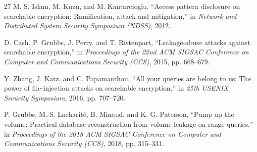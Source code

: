 \begin{thebibliography}{27}
 M. S. Islam, M. Kuzu, and M. Kantarcioglu, ``Access pattern disclosure on searchable encryption: Ramification, attack and mitigation,'' in \emph{Network and Distributed System Security Symposium (NDSS)}, 2012.

 D. Cash, P. Grubbs, J. Perry, and T. Ristenpart, ``Leakage-abuse attacks against searchable encryption,'' in \emph{Proceedings of the 22nd ACM SIGSAC Conference on Computer and Communications Security (CCS)}, 2015, pp. 668--679.

 Y. Zhang, J. Katz, and C. Papamanthou, ``All your queries are belong to us: The power of file-injection attacks on searchable encryption,'' in \emph{25th USENIX Security Symposium}, 2016, pp. 707--720.

 P. Grubbs, M.-S. Lacharit\'{e}, B. Minaud, and K. G. Paterson, ``Pump up the volume: Practical database reconstruction from volume leakage on range queries,'' in \emph{Proceedings of the 2018 ACM SIGSAC Conference on Computer and Communications Security (CCS)}, 2018, pp. 315--331.

\end{thebibliography}
